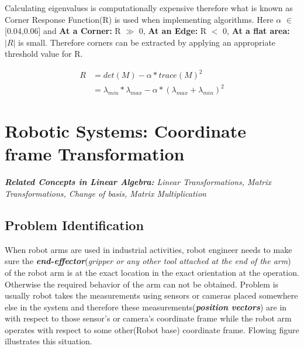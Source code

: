 \documentclass[a4paper,11pt]{article}%
\begin{document}
Calculating eigenvalues is computationally expensive therefore what is known as Corner Response Function(R) is used when implementing algorithms. Here $\alpha$ $\in$ [0.04,0.06] and \textbf{At a Corner:} R $\gg$ 0, \textbf{At an Edge:} R $<$ 0, \textbf{At a flat area:} $|R|$ is small. Therefore corners can be extracted by applying an appropriate threshold value for R.

\begin{equation}
	\begin{split}
R &= det(M) - \alpha* trace(M)^2\\
 & = \lambda_{min}*\lambda_{max} - \alpha*(\lambda_{max} + \lambda_{min})^2
	\end{split}
\end{equation}




\pagebreak

\section{Robotic Systems: Coordinate frame Transformation}

\textit{\large \textbf{Related Concepts in Linear Algebra:} Linear Transformations, Matrix Transformations, Change of basis, Matrix Multiplication}

\subsection{Problem Identification}

When robot arms are used in industrial activities, robot engineer needs to make sure the \textbf{\textit{end-effector}}(\textit{gripper or any other tool attached at the end of the arm}) of the robot arm is at the exact location in the exact orientation at the operation. Otherwise the required behavior of the arm can not be obtained. Problem is usually robot takes the measurements using sensors or cameras placed somewhere else in the system and therefore these measurements(\textbf{\textit{position vectors}}) are in with respect to those sensor's or camera's coordinate frame while the robot arm operates with respect to some other(Robot base) coordinate frame. Flowing figure illustrates this situation.\\
\end{document}
